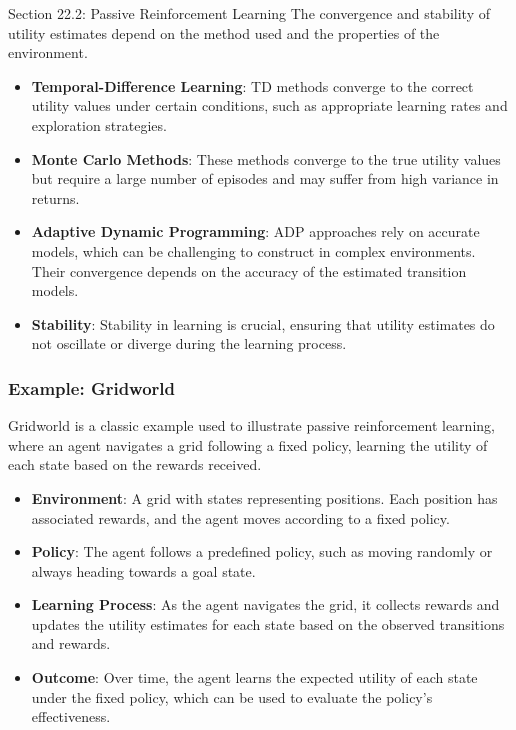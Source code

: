 \begin{notes}{Section 22.2: Passive Reinforcement Learning}
    The convergence and stability of utility estimates depend on the method used and the properties of the environment.
    
    \begin{highlight}
    
        \begin{itemize}
            \item \textbf{Temporal-Difference Learning}: TD methods converge to the correct utility values under certain conditions, such as appropriate learning rates and exploration strategies.
            \item \textbf{Monte Carlo Methods}: These methods converge to the true utility values but require a large number of episodes and may suffer from high variance in returns.
            \item \textbf{Adaptive Dynamic Programming}: ADP approaches rely on accurate models, which can be challenging to construct in complex environments. Their convergence depends on the accuracy of the 
            estimated transition models.
            \item \textbf{Stability}: Stability in learning is crucial, ensuring that utility estimates do not oscillate or diverge during the learning process.
        \end{itemize}
    
    \end{highlight}
    
    \subsubsection*{Example: Gridworld}
    
    Gridworld is a classic example used to illustrate passive reinforcement learning, where an agent navigates a grid following a fixed policy, learning the utility of each state based on the rewards received.
    
    \begin{highlight}
    
        \begin{itemize}
            \item \textbf{Environment}: A grid with states representing positions. Each position has associated rewards, and the agent moves according to a fixed policy.
            \item \textbf{Policy}: The agent follows a predefined policy, such as moving randomly or always heading towards a goal state.
            \item \textbf{Learning Process}: As the agent navigates the grid, it collects rewards and updates the utility estimates for each state based on the observed transitions and rewards.
            \item \textbf{Outcome}: Over time, the agent learns the expected utility of each state under the fixed policy, which can be used to evaluate the policy's effectiveness.
        \end{itemize}
    

\end{highlight}
\end{notes}
